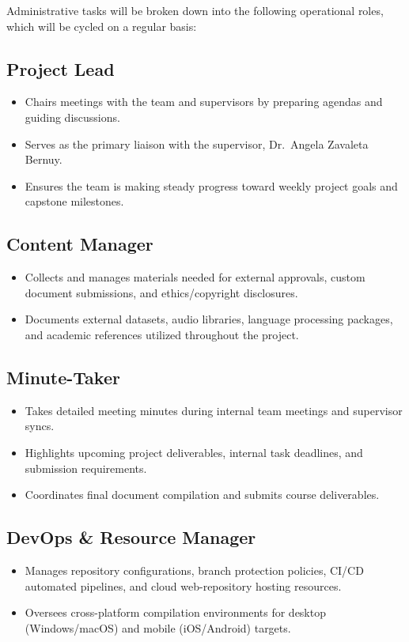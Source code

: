 \documentclass{article}
\begin{document}
\vspace{1em}

Administrative tasks will be broken down into the following operational roles, which will be cycled on a regular basis:

\subsection{Project Lead}
\begin{itemize}
    \item Chairs meetings with the team and supervisors by preparing agendas and guiding discussions.
    \item Serves as the primary liaison with the supervisor, Dr.~Angela Zavaleta Bernuy.
    \item Ensures the team is making steady progress toward weekly project goals and capstone milestones.
\end{itemize}

\subsection{Content Manager}
\begin{itemize}
    \item Collects and manages materials needed for external approvals, custom document submissions, and ethics/copyright disclosures.
    \item Documents external datasets, audio libraries, language processing packages, and academic references utilized throughout the project.
\end{itemize}

\subsection{Minute-Taker}
\begin{itemize}
    \item Takes detailed meeting minutes during internal team meetings and supervisor syncs.
    \item Highlights upcoming project deliverables, internal task deadlines, and submission requirements.
    \item Coordinates final document compilation and submits course deliverables.
\end{itemize}

\subsection{DevOps \& Resource Manager}
\begin{itemize}
    \item Manages repository configurations, branch protection policies, CI/CD automated pipelines, and cloud web-repository hosting resources.
    \item Oversees cross-platform compilation environments for desktop (Windows/macOS) and mobile (iOS/Android) targets.
\end{itemize}
\end{document}
